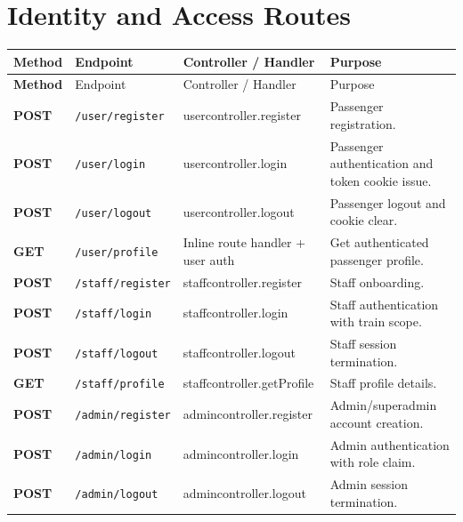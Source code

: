 \documentclass[12pt,a4paper]{report}
\renewcommand{\toprule}{\hline\hline}
\renewcommand{\midrule}{\hline}
\renewcommand{\bottomrule}{\hline\hline}
\begin{document}
\section{Identity and Access Routes}
\begin{longtable}{>{\bfseries}p{} p{} p{} p{}}
\toprule
\rowcolor{TableHeader}
\textcolor{TableHeaderText}{Method} & \textcolor{TableHeaderText}{Endpoint} & \textcolor{TableHeaderText}{Controller / Handler} & \textcolor{TableHeaderText}{Purpose} \\
\midrule
\endfirsthead
\toprule
\rowcolor{TableHeader}
\textcolor{TableHeaderText}{Method} & \textcolor{TableHeaderText}{Endpoint} & \textcolor{TableHeaderText}{Controller / Handler} & \textcolor{TableHeaderText}{Purpose} \\
\midrule
\endhead
POST & \texttt{/user/register} & usercontroller.register & Passenger registration. \\
POST & \texttt{/user/login} & usercontroller.login & Passenger authentication and token cookie issue. \\
POST & \texttt{/user/logout} & usercontroller.logout & Passenger logout and cookie clear. \\
GET & \texttt{/user/profile} & Inline route handler + user auth & Get authenticated passenger profile. \\
POST & \texttt{/staff/register} & staffcontroller.register & Staff onboarding. \\
POST & \texttt{/staff/login} & staffcontroller.login & Staff authentication with train scope. \\
POST & \texttt{/staff/logout} & staffcontroller.logout & Staff session termination. \\
GET & \texttt{/staff/profile} & staffcontroller.getProfile & Staff profile details. \\
POST & \texttt{/admin/register} & admincontroller.register & Admin/superadmin account creation. \\
POST & \texttt{/admin/login} & admincontroller.login & Admin authentication with role claim. \\
POST & \texttt{/admin/logout} & admincontroller.logout & Admin session termination. \\
\bottomrule
\end{longtable}
\end{document}
